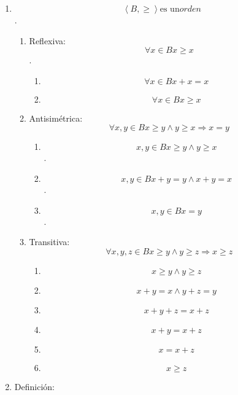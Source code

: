 \documentclass[
]{article}
\providecommand{\tightlist}{%
  \setlength{\itemsep}{0pt}\setlength{\parskip}{0pt}}
\begin{document}
\begin{enumerate}
\begin{enumerate}
\begin{enumerate}
      \[\forall x,{y \in B}{x \geq y}\Leftrightarrow{{x \cdot y} = y}\Leftrightarrow{{x + y} = x}\]
    \item
      \[\left\langle {B, \geq} \right\rangle\text{es un}\mathit{orden}\].

      \begin{enumerate}
      \def\labelenumiv{\arabic{enumiv}.}
      \item
        Reflexiva: \[\forall{x \in B}{x \geq x}\].

        \begin{enumerate}
        \def\labelenumv{\arabic{enumv}.}
        \tightlist
        \item
          \[\forall{x \in B}{{x + x} = x}\]
        \item
          \[\forall{x \in B}{x \geq x}\]
        \end{enumerate}
      \item
        Antisimétrica:
        \[\forall x,{y \in B}{{x \geq {y \land y}} \geq x}\Rightarrow{x = y}\]

        \begin{enumerate}
        \def\labelenumv{\arabic{enumv}.}
        \tightlist
        \item
          \[x,{y \in B}{{x \geq {y \land y}} \geq x}\].
        \item
          \[x,{y \in B}{{{x + y} = {{y \land x} + y}} = x}\].
        \item
          \[x,{y \in B}{x = y}\].
        \end{enumerate}
      \item
        Transitiva:
        \[\forall x,y,{z \in B}{{x \geq {y \land y}} \geq z}\Rightarrow{x \geq z}\]

        \begin{enumerate}
        \def\labelenumv{\arabic{enumv}.}
        \tightlist
        \item
          \[{x \geq {y \land y}} \geq z\]
        \item
          \[{{x + y} = {{x \land y} + z}} = y\]
        \item
          \[{{x + y} + z} = {x + z}\]
        \item
          \[{x + y} = {x + z}\]
        \item
          \[x = {x + z}\]
        \item
          \[x \geq z\]
        \end{enumerate}
      \end{enumerate}
    \item
      Definición:


\end{enumerate}
\end{enumerate}
\end{enumerate}
\end{document}
